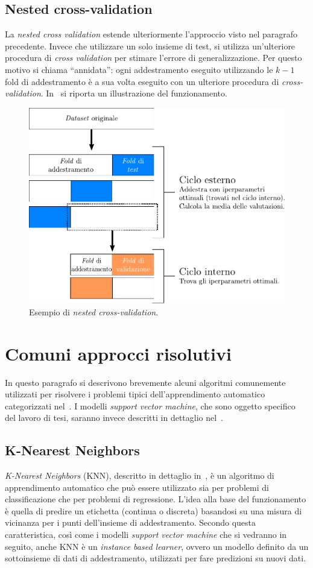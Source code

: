 \subsection{Nested cross-validation}
La \emph{nested cross validation} estende ulteriormente l'approccio visto nel paragrafo precedente.
Invece che utilizzare un solo insieme di test, si utilizza un'ulteriore procedura di \emph{cross validation} per stimare l'errore di generalizzazione.
Per questo motivo si chiama ``annidata'': ogni addestramento eseguito utilizzando le $k-1$ fold di addestramento è a sua volta eseguito con un ulteriore procedura di \emph{cross-validation}.
In~ si riporta un illustrazione del funzionamento.
\begin{figure}
    \centering
    \includegraphics[width=0.8\linewidth]{img/nested_cv.pdf}
    \caption[Esempio \emph{nested cross-validation}.]{Esempio di \emph{nested cross-validation}.}
    \label{fig:nested_cv}
\end{figure}

\section{Comuni approcci risolutivi}\label{sec:comuni_approcci_risolutivi}
In questo paragrafo si descrivono brevemente alcuni algoritmi comunemente utilizzati per risolvere i problemi tipici dell'apprendimento automatico categorizzati nel~.
I modelli \emph{support vector machine}, che sono oggetto specifico del lavoro di tesi, saranno invece descritti in dettaglio nel~.

\subsection{K-Nearest Neighbors}\label{sec:ml:knn}
\emph{K-Nearest Neighbors} (KNN), descritto in dettaglio in~\cite{KNN}, è un algoritmo di apprendimento automatico che può essere utilizzato sia per problemi di classificazione che  per problemi di regressione. 
L'idea alla base del funzionamento è quella di predire un etichetta (continua o discreta) basandosi su una misura di vicinanza per i punti dell'insieme di addestramento. 
Secondo questa caratteristica, così come i modelli \emph{support vector machine} che si vedranno in seguito, anche KNN è un \emph{instance based learner}, ovvero un modello definito da un sottoinsieme di dati di addestramento, utilizzati per fare predizioni su nuovi dati.

